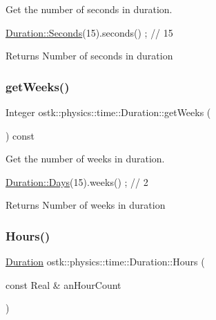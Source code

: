 Get the number of seconds in duration. 


\begin{DoxyCode}
\hyperlink{classostk_1_1physics_1_1time_1_1_duration_ad973fa34fcc308fdcc8d50c3ee694764}{Duration::Seconds}(15).seconds() ; \textcolor{comment}{// 15}
\end{DoxyCode}


\begin{DoxyReturn}{Returns}
Number of seconds in duration 
\end{DoxyReturn}
\mbox{\label{classostk_1_1physics_1_1time_1_1_duration_af42d2314c9d99b87ff09cf8470a460cd}} 
\subsubsection{\texorpdfstring{get\+Weeks()}{getWeeks()}}
{\footnotesize\ttfamily Integer ostk\+::physics\+::time\+::\+Duration\+::get\+Weeks (\begin{DoxyParamCaption}{ }\end{DoxyParamCaption}) const}



Get the number of weeks in duration. 


\begin{DoxyCode}
\hyperlink{classostk_1_1physics_1_1time_1_1_duration_aefb4abc87c6957d00650228d069fa1e1}{Duration::Days}(15).weeks() ; \textcolor{comment}{// 2}
\end{DoxyCode}


\begin{DoxyReturn}{Returns}
Number of weeks in duration 
\end{DoxyReturn}
\mbox{\label{classostk_1_1physics_1_1time_1_1_duration_a950723133d46c93a06907543d15e4dc0}} 
\subsubsection{\texorpdfstring{Hours()}{Hours()}}
{\footnotesize\ttfamily \hyperlink{classostk_1_1physics_1_1time_1_1_duration}{Duration} ostk\+::physics\+::time\+::\+Duration\+::\+Hours (\begin{DoxyParamCaption}\item[{const Real \&}]{an\+Hour\+Count }\end{DoxyParamCaption})\hspace{0.3cm}{\ttfamily [static]}}



